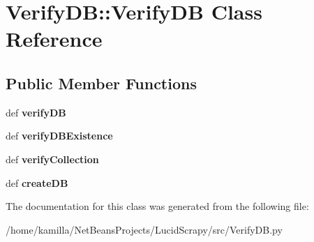 \hypertarget{classVerifyDB_1_1VerifyDB}{
\section{VerifyDB::VerifyDB Class Reference}
\label{classVerifyDB_1_1VerifyDB}
}
\subsection*{Public Member Functions}
\begin{DoxyCompactItemize}
\item 
\hypertarget{classVerifyDB_1_1VerifyDB_a5b43f43ea2cbeffac03f3be89fce1e28}{
def {\bfseries verifyDB}}
\label{classVerifyDB_1_1VerifyDB_a5b43f43ea2cbeffac03f3be89fce1e28}

\item 
\hypertarget{classVerifyDB_1_1VerifyDB_adc9e063542ea89d5196944ecee1105de}{
def {\bfseries verifyDBExistence}}
\label{classVerifyDB_1_1VerifyDB_adc9e063542ea89d5196944ecee1105de}

\item 
\hypertarget{classVerifyDB_1_1VerifyDB_a77d8c09116390afa9f0559aef066a8b0}{
def {\bfseries verifyCollection}}
\label{classVerifyDB_1_1VerifyDB_a77d8c09116390afa9f0559aef066a8b0}

\item 
\hypertarget{classVerifyDB_1_1VerifyDB_a2a5acef459d6d7505c4fcc4b27941819}{
def {\bfseries createDB}}
\label{classVerifyDB_1_1VerifyDB_a2a5acef459d6d7505c4fcc4b27941819}

\end{DoxyCompactItemize}


The documentation for this class was generated from the following file:\begin{DoxyCompactItemize}
\item 
/home/kamilla/NetBeansProjects/LucidScrapy/src/VerifyDB.py\end{DoxyCompactItemize}

